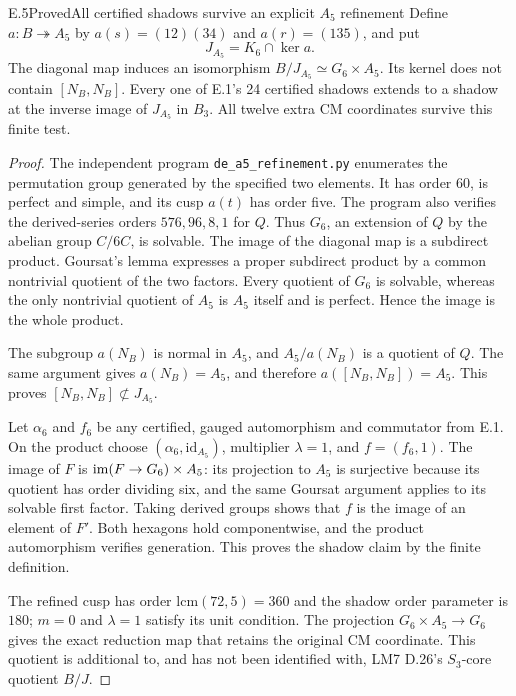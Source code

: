 \begin{statement}{E.5}{Proved}{All certified shadows survive an explicit $A_5$ refinement}
Define $a:B\twoheadrightarrow A_5$ by
$a(s)=(12)(34)$ and $a(r)=(135)$, and put
\[
 J_{A_5}=K_6\cap\ker a.
\]
The diagonal map induces an isomorphism
$B/J_{A_5}\simeq G_6\times A_5$. Its kernel does not contain
$[N_B,N_B]$. Every one of E.1's 24 certified shadows extends to a
shadow at the inverse image of $J_{A_5}$ in $B_3$. All twelve extra
CM coordinates survive this finite test.
\end{statement}
\begin{proof}
The independent program \texttt{de\_a5\_refinement.py} enumerates
the permutation group generated by the specified two elements.
It has order 60, is perfect and simple, and its cusp $a(t)$ has
order five. The program also verifies the derived-series orders
$576,96,8,1$ for $Q$. Thus $G_6$, an extension of $Q$ by the
abelian group $C/6C$, is solvable. The image of the diagonal map
is a subdirect product. Goursat's lemma expresses a proper subdirect
product by a common nontrivial quotient of the two factors. Every
quotient of $G_6$ is solvable, whereas the only nontrivial quotient
of $A_5$ is $A_5$ itself and is perfect. Hence the image is the
whole product.

The subgroup $a(N_B)$ is normal in $A_5$, and
$A_5/a(N_B)$ is a quotient of $Q$. The same argument gives
$a(N_B)=A_5$, and therefore $a([N_B,N_B])=A_5$.
This proves $[N_B,N_B]\not\subset J_{A_5}$.

Let $\alpha_6$ and $f_6$ be any certified, gauged automorphism and
commutator from E.1. On the product choose
$(\alpha_6,\mathrm{id}_{A_5})$, multiplier $\lambda=1$, and
$f=(f_6,1)$. The image of $F$ is
$\operatorname{im}(F\to G_6)\times A_5$: its projection to $A_5$ is surjective
because its quotient has order dividing six, and the same Goursat
argument applies to its solvable first factor. Taking derived groups
shows that $f$ is the image of an element of $F'$. Both hexagons hold
componentwise, and the product automorphism verifies generation.
This proves the shadow claim by the finite definition.

The refined cusp has order $\mathrm{lcm}(72,5)=360$ and the shadow
order parameter is $180$; $m=0$ and $\lambda=1$ satisfy its unit
condition. The projection $G_6\times A_5\to G_6$ gives the exact
reduction map that retains the original CM coordinate. This quotient
is additional to, and has not been identified with, LM7 D.26's
$S_3$-core quotient $B/J$.
\end{proof}

